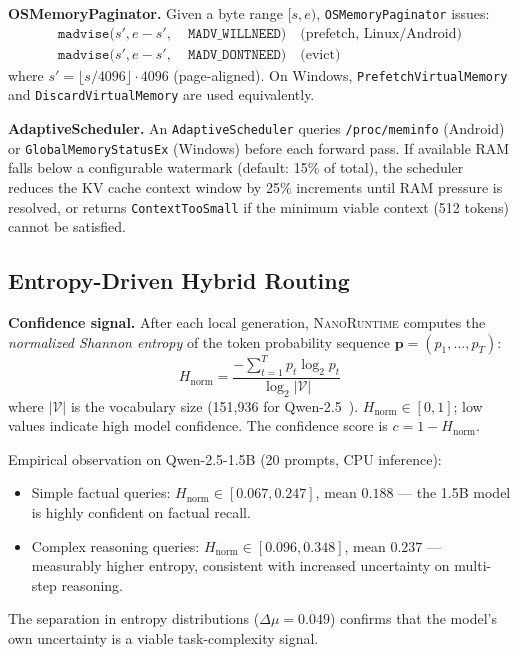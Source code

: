 \documentclass[11pt]{article}
\newcommand{\nanort}{\textsc{NanoRuntime}}
\begin{document}
\textbf{OSMemoryPaginator.}
Given a byte range $[s, e)$, \texttt{OSMemoryPaginator} issues:
\begin{align}
  \texttt{madvise}(s', e-s',\; &\texttt{MADV\_WILLNEED})
    \quad \text{(prefetch, Linux/Android)} \label{eq:willneed}\\
  \texttt{madvise}(s', e-s',\; &\texttt{MADV\_DONTNEED})
    \quad \text{(evict)} \label{eq:dontneed}
\end{align}
where $s' = \lfloor s / 4096 \rfloor \cdot 4096$ (page-aligned).
On Windows, \texttt{PrefetchVirtualMemory} and
\texttt{DiscardVirtualMemory} are used equivalently.

\textbf{AdaptiveScheduler.}
An \texttt{AdaptiveScheduler} queries \texttt{/proc/meminfo} (Android)
or \texttt{GlobalMemoryStatusEx} (Windows) before each forward pass.
If available RAM falls below a configurable watermark
(default: 15\% of total), the scheduler reduces the KV cache
context window by 25\% increments until RAM pressure is resolved,
or returns \texttt{ContextTooSmall} if the minimum viable context
(512 tokens) cannot be satisfied.

\subsection{Entropy-Driven Hybrid Routing}
\label{sec:routing}

\textbf{Confidence signal.}
After each local generation, \nanort{} computes the \emph{normalized
Shannon entropy} of the token probability sequence
$\mathbf{p} = (p_1, \ldots, p_T)$:
\begin{equation}
  H_{\text{norm}} = \frac{-\sum_{t=1}^{T} p_t \log_2 p_t}{\log_2 |\mathcal{V}|}
  \label{eq:entropy}
\end{equation}
where $|\mathcal{V}|$ is the vocabulary size (151,936 for Qwen-2.5~\cite{qwen25}).
$H_{\text{norm}} \in [0, 1]$; low values indicate high model confidence.
The confidence score is $c = 1 - H_{\text{norm}}$.

Empirical observation on Qwen-2.5-1.5B (20 prompts, CPU inference):
\begin{itemize}
  \item Simple factual queries: $H_{\text{norm}} \in [0.067, 0.247]$,
    mean $0.188$ — the 1.5B model is highly confident on factual recall.
  \item Complex reasoning queries: $H_{\text{norm}} \in [0.096, 0.348]$,
    mean $0.237$ — measurably higher entropy, consistent with
    increased uncertainty on multi-step reasoning.
\end{itemize}
The separation in entropy distributions ($\Delta\mu = 0.049$)
confirms that the model's own uncertainty is a viable task-complexity signal.
\end{document}
